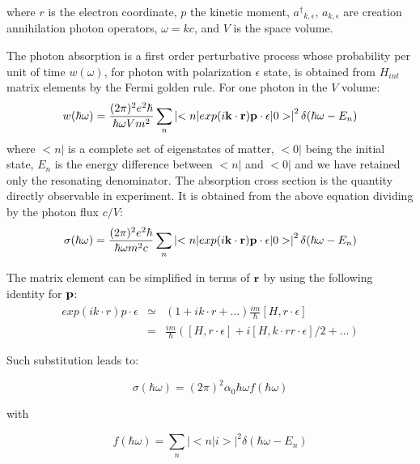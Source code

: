 \documentclass[a4paper,11pt]{report}
\begin{document}
where ${ r}$ is the electron coordinate, ${ p}$ the kinetic moment, ${  a^\dagger }_{ k,\epsilon}$, $a_{ k ,\epsilon}$ 
are creation annihilation photon operators, $\omega= kc $, and $V$ is the space volume.

The photon absorption is  a first  order perturbative process whose probability  per unit of time $w(\omega)$, 
for photon with polarization  $\epsilon$  state, 
is obtained from  $H_{int}$  matrix elements by the Fermi golden rule. For one photon in the $V$ volume:
\begin{equation}
  w(\hbar \omega) = \frac{(2 \pi)^2 e^2 \hbar }{\hbar \omega  V m^2 }  \sum_n  \left|< n |  exp(i { {\bf k} \cdot {\bf  r}} ) { {\bf  p} \cdot  {\bf \epsilon} } | 0 >\right|^2   \delta( \hbar \omega-E_n) 
\end{equation}
where $<n|$ is a complete set of eigenstates of matter, $<0|$  being the initial state, $ E_n$ is the energy difference between $<n|$ and $<0|$  and we have retained only the resonating denominator. 
The absorption cross section is the quantity directly observable in experiment. It is obtained from the above equation dividing by the photon flux  $c/V$:
\begin{equation}
  \sigma(\hbar \omega) = \frac{(2 \pi)^2 e^2 \hbar }{\hbar \omega   m^2 c }  \sum_n  \left|< n |  exp(i { {\bf k} \cdot {\bf  r}} ) { {\bf  p} \cdot  {\bf \epsilon} } | 0 >\right|^2   \delta( \hbar \omega-E_n) 
\end{equation}

The matrix element can be simplified in terms of ${\bf r}$ by using the following identity for  ${\bf p}$:
\begin{eqnarray}
 exp(i {  k \cdot r} ) {  p \cdot  \epsilon }
 & \simeq & ( 1 + i    k \cdot  r + ...  ) \frac{i m}{\hbar} [ H, {  r \cdot  \epsilon }] \\ 
 & = &
  \displaystyle\frac{i m}{\hbar} ([ H, {  r \cdot  \epsilon }] + i [ H, {  k \cdot r}  {  r \cdot  \epsilon }] /2 + ...) \label{expansion} \nonumber
\end{eqnarray} 

Such substitution leads to:

\begin{equation}
  \sigma(\hbar \omega) = (2 \pi)^2  \alpha_0   \hbar \omega    f(\hbar \omega)
\end{equation}

with 

\begin{equation}
  f(\hbar \omega)  =  \sum_n  \left| < n | i > \right|^2   \delta( \hbar \omega-E_n) \nonumber
\end{equation}
\end{document}
